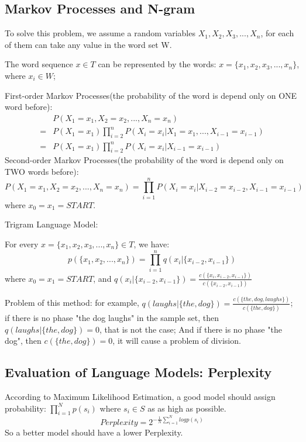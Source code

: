 \documentclass[12pt]{article}
\numberwithin{equation}{section}
\begin{document}
\subsection{Markov Processes and N-gram}
To solve this problem, we assume a random variables $X_1, X_2, X_3, ..., X_n$, for each of them can take any value in the word set W. \par
The word sequence $x \in T$ can be represented by the words: $x = \{x_1, x_2, x_3, ..., x_n\}$, where $x_i \in W$;\par
First-order Markov Processes(the probability of the word is depend only on ONE word before):
\begin{equation}\begin{split}
&P(X_1=x_1, X_2=x_2, ..., X_n=x_n)\\ 
=&P(X_1=x_1)\prod_{i=2}^{n}P(X_i=x_i|X_1=x_1, ..., X_{i-1}=x_{i-1})\\ 
=&P(X_1=x_1)\prod_{i=2}^{n}P(X_i=x_i|X_{i-1}=x_{i-1}) 
\end{split}\end{equation}
Second-order Markov Processes(the probability of the word is depend only on TWO words before):
\begin{equation}
	P(X_1=x_1, X_2=x_2, ..., X_n=x_n)=\prod_{i=1}^{n}P(X_i=x_i|X_{i-2}=x_{i-2}, X_{i-1}=x_{i-1}) 
\end{equation}
where $x_0=x_1=START$.\par
Trigram Language Model:\par
For every $x = \{x_1, x_2, x_3, ..., x_n\} \in T$, we have:
\begin{equation}
p(\{x_1, x_2, ..., x_n\})=\prod_{i=1}^{n}q(x_i|\{x_{i-2}, x_{i-1}\}) 
\end{equation}
where $x_0=x_1=START$, and $q(x_i|\{x_{i-2}, x_{i-1}\})=\frac{c(\{x_i, x_{i-2}, x_{i-1}\})}{c(\{x_{i-2}, x_{i-1}\})}$ \par
Problem of this method: for example, $q(laughs|\{the, dog\})=\frac{c(\{the, dog, laughs\})}{c(\{the, dog\})}$; if there is no phase "the dog laughs" in the sample set, then $q(laughs|\{the, dog\})=0$, that is not the case; And if there is no phase "the dog", then $c(\{the, dog\})=0$, it will cause a problem of division.
\subsection{Evaluation of Language Models: Perplexity}
According to Maximum Likelihood Estimation, a good model should assign probability: $\prod_{i=1}^{N}p(s_i)$ where $s_i \in S$ as as high as possible.
\begin{equation}
Perplexity=2^{-\frac{1}{N}\sum_{i=1}^{N}log p(s_i)}
\end{equation}
So a better model should have a lower Perplexity.
\end{document}
